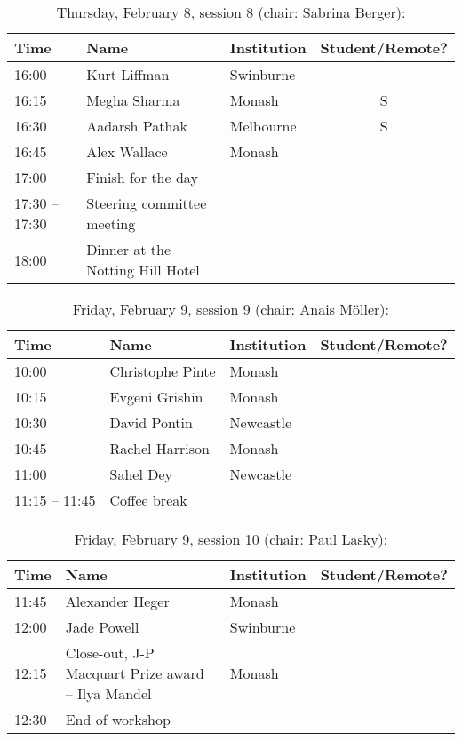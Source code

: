 \documentclass[amsmath,onecolumn]{revtex4-1}
\begin{document}
\begin{table}[!htbp]
	\centering
	\caption{Thursday, February 8, session 8 (chair: Sabrina Berger):}
\begin{tabular}{| l | l | l | c |}
	\hline
	Time & Name  & Institution & Student/Remote? \\ 		
	\hline
	16:00 & Kurt	Liffman & Swinburne & \\
	16:15 & Megha	Sharma & Monash & S \\
	16:30 & Aadarsh	Pathak & Melbourne & S \\ 
	16:45 & Alex	Wallace & Monash& \\
	\hline
	17:00 & Finish for the day & & \\
	\hline
	17:30 -- 17:30 & Steering committee meeting & & \\
	18:00 & Dinner at the Notting Hill Hotel & & \\
	\hline
\end{tabular}
\end{table}

\begin{table}[!htbp]
	\centering
	\caption{Friday, February 9, session 9 (chair: Anais M\"{o}ller):}
\begin{tabular}{| l | l | l | c |}
	\hline
	Time & Name  & Institution & Student/Remote? \\ 		
	\hline
	10:00 & Christophe 	Pinte & Monash & \\
	10:15 & Evgeni	Grishin & Monash & \\
	10:30 & David	Pontin & Newcastle & \\
	10:45 & Rachel Harrison & Monash & \\
	11:00 & Sahel	Dey & Newcastle & \\
	\hline
	11:15 -- 11:45 & Coffee break & & \\
	\hline
\end{tabular}
\end{table}

\begin{table}[!htbp]
	\centering
	\caption{Friday, February 9, session 10 (chair: Paul Lasky):}
\begin{tabular}{| l | l | l | c |}
	\hline
	Time & Name  & Institution & Student/Remote? \\ 		
	\hline
	11:45 & Alexander	Heger & Monash & \\
	12:00 &  Jade	Powell & Swinburne & \\
	12:15 & Close-out, J-P Macquart Prize award -- Ilya Mandel & Monash & \\
	\hline
	12:30 & End of workshop & & \\
	\hline
\end{tabular}
\end{table}
\end{document}
